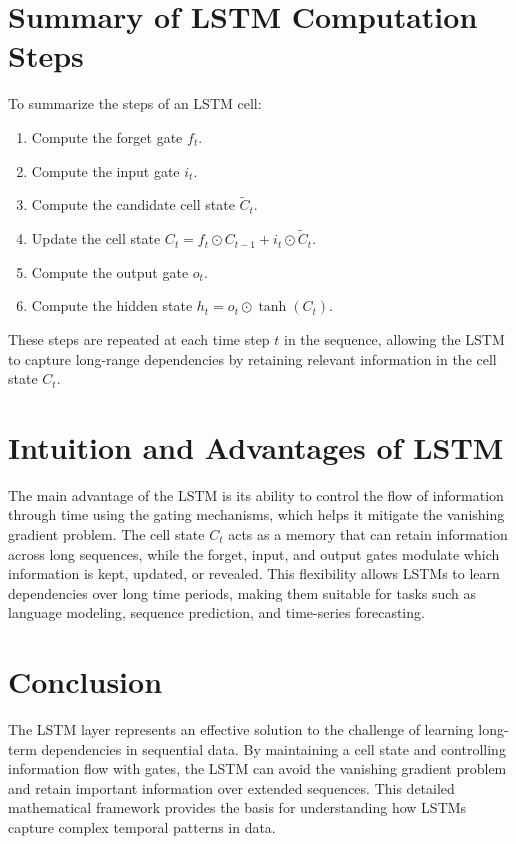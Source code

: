 \documentclass{article}
\begin{document}
\section{Summary of LSTM Computation Steps}
To summarize the steps of an LSTM cell:
\begin{enumerate}
    \item Compute the forget gate \( f_t \).
    \item Compute the input gate \( i_t \).
    \item Compute the candidate cell state \( \tilde{C}_t \).
    \item Update the cell state \( C_t = f_t \odot C_{t-1} + i_t \odot \tilde{C}_t \).
    \item Compute the output gate \( o_t \).
    \item Compute the hidden state \( h_t = o_t \odot \tanh(C_t) \).
\end{enumerate}

These steps are repeated at each time step \( t \) in the sequence, allowing the LSTM to capture long-range dependencies by retaining relevant information in the cell state \( C_t \).

\section{Intuition and Advantages of LSTM}
The main advantage of the LSTM is its ability to control the flow of information through time using the gating mechanisms, which helps it mitigate the vanishing gradient problem. The cell state \( C_t \) acts as a memory that can retain information across long sequences, while the forget, input, and output gates modulate which information is kept, updated, or revealed. This flexibility allows LSTMs to learn dependencies over long time periods, making them suitable for tasks such as language modeling, sequence prediction, and time-series forecasting.

\section{Conclusion}
The LSTM layer represents an effective solution to the challenge of learning long-term dependencies in sequential data. By maintaining a cell state and controlling information flow with gates, the LSTM can avoid the vanishing gradient problem and retain important information over extended sequences. This detailed mathematical framework provides the basis for understanding how LSTMs capture complex temporal patterns in data.

% 
% 
\end{document}
